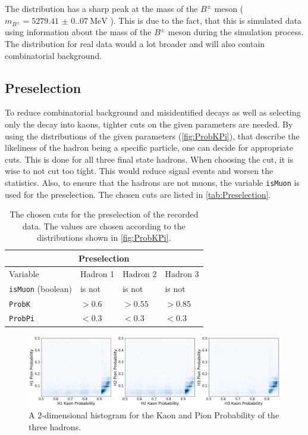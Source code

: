 The distribution has a sharp peak at the mass of the $B^{\pm}$ meson ($m_{B^{\pm}} = \qty{5279.41(0.07)}{\mega\electronvolt}$ \cite{PDG}). This is due to the fact, that this is simulated data using information about the mass of the $B^{\pm}$ meson during
the simulation process. The distribution for real data would a lot broader and will also contain combinatorial background.

\subsection{Preselection}

To reduce combinatorial background and misidentified decays as well as selecting only the decay into kaons, tighter cuts on the given parameters are needed. By using the distributions of the given
parameters (\autoref{fig:ProbKPi}), that describe the likeliness of the hadron being a specific particle, one can decide for appropriate cuts. This is done for all three final state
hadrons. When choosing the cut, it is wise to not cut too tight. This would reduce signal events and worsen the statistics. Also, to ensure that the
hadrons are not muons, the variable \texttt{isMuon} is used for the preselection. The chosen cuts are listed
in \autoref{tab:Preselection}.
\begin{table}[h!]
  \centering
    \begin{tabular}{ |p{3cm}||p{3cm}|p{3cm}|p{3cm}|  }
      \hline
      \multicolumn{4}{|c|}{Preselection} \\
      \hline
      Variable & Hadron 1 &Hadron 2 &Hadron 3\\
      \hline
      \texttt{isMuon} (boolean)   & is not &is not&  is not\\
      \texttt{ProbK}&   $> 0.6$  &$> 0.55$   &$> 0.85$\\
      \texttt{ProbPi} & $< 0.3$ & $< 0.3$&  $< 0.3$\\
      \hline   
    \end{tabular}
    \caption{The chosen cuts for the preselection of the recorded data. The values are chosen according to the distributions shown in \autoref{fig:ProbKPi}.}
    \label{tab:Preselection}
\end{table}
\begin{figure}
  \centering
  \includegraphics[width = .95\textwidth]{"content/pics/ProbKPi.png"}

  \caption{A 2-dimensional histogram for the Kaon and Pion Probability of the three hadrons.}
  \label{fig:ProbKPi}
\end{figure}
